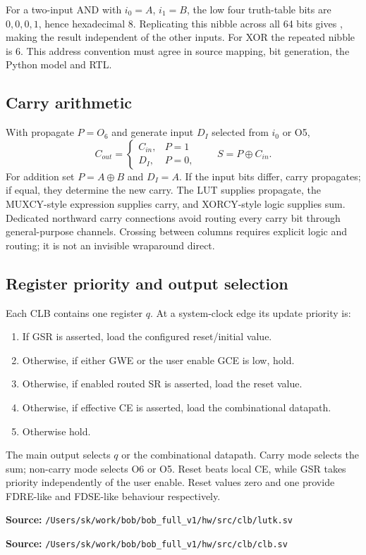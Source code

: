 \documentclass[11pt,a4paper]{article}
\newcommand{\code}[1]{\texttt{\detokenize{#1}}}
\newcommand{\src}[1]{\par\smallskip\noindent\textbf{Source: }\nolinkurl{/Users/sk/work/bob/bob_full_v1/#1}\par\smallskip}
\begin{document}
For a two-input AND with $i_0=A$, $i_1=B$, the low four truth-table bits are
$0,0,0,1$, hence hexadecimal 8. Replicating this nibble across all 64 bits gives
\code{64'h8888888888888888}, making the result independent of the other inputs.
For XOR the repeated nibble is 6. This address convention must agree in source
mapping, bit generation, the Python model and RTL.

\subsection{Carry arithmetic}
With propagate $P=O_6$ and generate input $D_I$ selected from $i_0$ or O5,
\[
C_{out}=\begin{cases}C_{in},&P=1\\D_I,&P=0,\end{cases}
\qquad S=P\oplus C_{in}.
\]
For addition set $P=A\oplus B$ and $D_I=A$. If the input bits differ, carry
propagates; if equal, they determine the new carry. The LUT supplies propagate,
the MUXCY-style expression supplies carry, and XORCY-style logic supplies sum.
Dedicated northward carry connections avoid routing every carry bit through
general-purpose channels. Crossing between columns requires explicit logic and
routing; it is not an invisible wraparound direct.

\subsection{Register priority and output selection}
Each CLB contains one register $q$. At a system-clock edge its update priority is:
\begin{enumerate}
\item If GSR is asserted, load the configured reset/initial value.
\item Otherwise, if either GWE or the user enable GCE is low, hold.
\item Otherwise, if enabled routed SR is asserted, load the reset value.
\item Otherwise, if effective CE is asserted, load the combinational datapath.
\item Otherwise hold.
\end{enumerate}
The main output selects $q$ or the combinational datapath. Carry mode selects
the sum; non-carry mode selects O6 or O5. Reset beats local CE, while GSR takes
priority independently of the user enable. Reset values zero and one provide
FDRE-like and FDSE-like behaviour respectively.
\src{hw/src/clb/lutk.sv}
\src{hw/src/clb/clb.sv}
\end{document}

